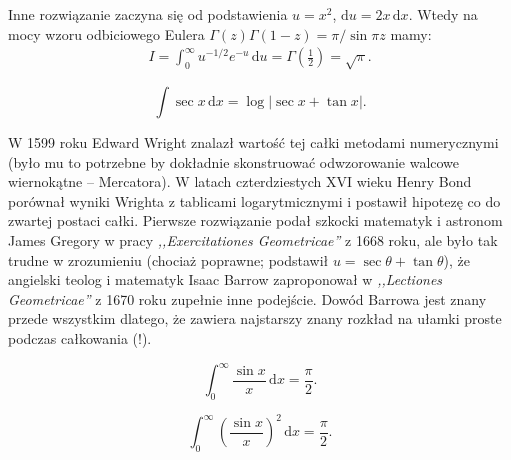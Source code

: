 Inne rozwiązanie zaczyna się od podstawienia $u = x^2$, $\mathrm{d} u = 2x \,\mathrm{d}x$.
Wtedy na mocy wzoru odbiciowego Eulera $\Gamma (z) \Gamma(1-z) = \pi/\sin \pi z$ mamy:
\begin{align}
	I = \int_0^\infty u^{-1/2} e^{-u}\,\mathrm{d}u = \Gamma \left(\frac 12\right) = \sqrt{\pi}.
\end{align}

\begin{problem}
    \begin{equation}
        \int \sec x \,\mathrm{d} x = \log| \sec x + \tan x|.
    \end{equation}
\end{problem}

W 1599 roku Edward Wright znalazł wartość tej całki metodami numerycznymi (było mu to potrzebne by dokładnie skonstruować odwzorowanie walcowe wiernokątne -- Mercatora).
%
%
W latach czterdziestych XVI wieku Henry Bond porównał wyniki Wrighta z tablicami logarytmicznymi i postawił hipotezę co do zwartej postaci całki.
%
Pierwsze rozwiązanie podał szkocki matematyk i astronom James Gregory w pracy \emph{,,Exercitationes Geometricae''} z 1668 roku, ale było tak trudne w zrozumieniu (chociaż poprawne; podstawił $u = \sec \theta + \tan \theta$), że angielski teolog i matematyk Isaac Barrow zaproponował w \emph{,,Lectiones Geometricae''} z 1670 roku zupełnie inne podejście.
%
%
Dowód Barrowa jest znany przede wszystkim dlatego, że zawiera najstarszy znany rozkład na ułamki proste podczas całkowania (!).
%

\begin{problem}
    \begin{equation}
        \int_0^\infty \frac {\sin x}{x} \,\mathrm{d} x = \frac \pi 2.
    \end{equation}
\end{problem}

\begin{problem}
    \begin{equation}
        \int_0^\infty \left(\frac {\sin x}{x}\right)^2 \,\mathrm{d} x = \frac \pi 2.
    \end{equation}
\end{problem}

